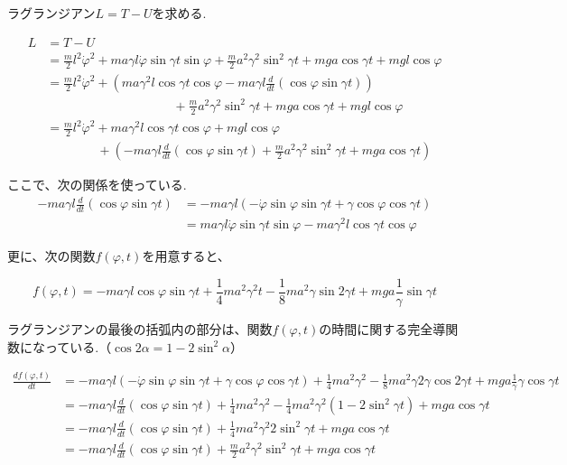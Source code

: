 ラグランジアン$L=T-U$を求める.

\begin{align*}
   L &= T-U\\
   &=\frac{m}{2}l^2\dot{\varphi}^2 + ma\gamma l\dot{\varphi}\sin\gamma t\sin\varphi + \frac{m}{2}a^2\gamma^2\sin^2\gamma t + mga\cos\gamma t + mgl\cos\varphi\\
   &=\frac{m}{2}l^2\dot{\varphi}^2 +\left(ma\gamma^2l\cos\gamma t\cos\varphi -ma\gamma l\frac{d}{dt}(\cos\varphi\sin\gamma t)\right)\\
   &\qquad \qquad \qquad \qquad\quad \quad  +\frac{m}{2}a^2\gamma^2\sin^2\gamma t + mga\cos\gamma t +mgl\cos\varphi\\&=\frac{m}{2}l^2\dot{\varphi}^2+ma\gamma^2l\cos\gamma t\cos\varphi + mgl\cos\varphi\\
   &\qquad \qquad +\left(-ma\gamma l\frac{d}{dt}(\cos\varphi\sin\gamma t) + \frac{m}{2}a^2\gamma^2\sin^2\gamma t + mga\cos\gamma t \right)
\end{align*}

ここで、次の関係を使っている.
\begin{align*}
   -ma\gamma l\frac{d}{dt}(\cos\varphi\sin\gamma t) &= -ma\gamma l\left( -\dot{\varphi}\sin\varphi\sin\gamma t +\gamma\cos\varphi\cos\gamma t \right)\\
   &= ma\gamma l\dot{\varphi}\sin\gamma t\sin\varphi - ma\gamma^2l\cos\gamma t\cos\varphi
\end{align*}

更に、次の関数$f(\varphi,t)$を用意すると、

\[f(\varphi,t)=-ma\gamma l\cos\varphi\sin\gamma t + \displaystyle\frac{1}{4}ma^2\gamma^2t - \frac{1}{8}ma^2\gamma\sin 2\gamma t + mga\frac{1}{\gamma}\sin\gamma t\]

ラグランジアンの最後の括弧内の部分は、関数$f(\varphi,t)$の時間に関する完全導関数になっている.（$\cos2\alpha=1-2\sin^2\alpha$）

\begin{align*}
   \frac{df(\varphi,t)}{dt}&=-ma\gamma l(-\dot{\varphi}\sin\varphi\sin\gamma t + \gamma\cos\varphi\cos\gamma t) +\frac{1}{4}ma^2\gamma^2 - \frac{1}{8}ma^2\gamma 2\gamma \cos2\gamma t + mga\frac{1}{\gamma}\gamma\cos\gamma t\\
   &= -ma\gamma l\frac{d}{dt}(\cos\varphi\sin\gamma t) + \frac{1}{4}ma^2\gamma^2 - \frac{1}{4}ma^2\gamma^2(1-2\sin^2\gamma t) + mga\cos\gamma t\\
   &= -ma\gamma l\frac{d}{dt}(\cos\varphi\sin\gamma t) + \frac{1}{4}ma^2\gamma^2 2\sin^2\gamma t + mga\cos\gamma t\\
   &= -ma\gamma l\frac{d}{dt}(\cos\varphi\sin\gamma t) + \frac{m}{2}a^2\gamma^2\sin^2\gamma t +mga\cos\gamma t
\end{align*}

